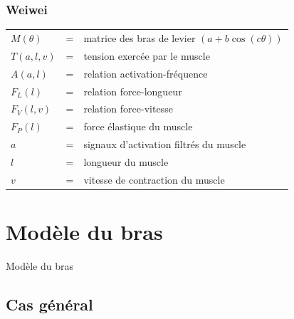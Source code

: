 \documentclass{beamer}
\begin{document}
\begin{frame}
\frametitle{Weiwei}
\begin{tabular}{lcl}
    $M(\theta)$  & = & matrice des bras de levier $(a + b \cos (c \theta))$ \\
    $T(a, l, v)$ & = & tension exercée par le muscle \\
    $A(a, l)$    & = & relation activation-fréquence \\
    $F_L(l)$     & = & relation force-longueur \\
    $F_V(l, v)$  & = & relation force-vitesse \\
    $F_P(l)$     & = & force élastique du muscle \\ %
    $a$          & = & signaux d'activation filtrés du muscle \\
    $l$          & = & longueur du muscle \\
    $v$          & = & vitesse de contraction du muscle \\
\end{tabular}
\end{frame}



\section{Modèle du bras}
\begin{frame}
\begin{center}
{\LARGE Modèle du bras}
\end{center}
\end{frame}


\subsection{Cas général}
\end{document}

